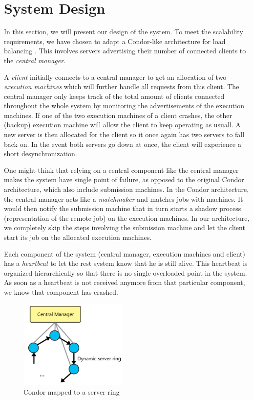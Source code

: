 \documentclass[a4paper,10pt]{article}
\begin{document}
\section{System Design}
\label{sec:design}

In this section, we will present our design of the system.
To meet the scalability requirements, we have chosen to adapt a Condor-like architecture for load balancing \cite{epema1996worldwide}.
This involves servers advertising their number of connected clients to the \emph{central manager}.

A \emph{client} initially connects to a central manager to get an allocation of two \emph{execution machines} which will further handle all requests from this client.
The central manager only keeps track of the total amount of clients connected throughout the whole system by monitoring the advertisements of the execution machines.
If one of the two execution machines of a client crashes, the other (backup) execution machine will allow the client to keep operating as usuall.
A new server is then allocated for the client so it once again has two servers to fall back on.
In the event both servers go down at once, the client will experience a short desynchronization.

One might think that relying on a central component like the central manager makes the system have single point of failure,
as opposed to the original Condor architecture, which also include submission machines.
In the Condor architecture, the central manager acts like a \emph{matchmaker} and matches jobs with machines.
It would then notify the submission machine that in turn starts a shadow process (representation of the remote job) on the execution machines.
In our architecture, we completely skip the steps involving the submission machine and let the client start its job on the allocated execution machines.

Each component of the system (central manager, execution machines and client) has a \emph{heartbeat} to let the rest system know that he is still alive.
This heartbeat is organized hierarchically so that there is no single overloaded point in the system.
As soon as a heartbeat is not received anymore from that particular component, we know that component has crashed.

\begin{figure}
    \begin{center}
        \includegraphics[width=0.48\textwidth]{serverring.png}    
    \end{center}
    \caption{Condor mapped to a server ring}
    \label{fig:serverring}
\end{figure}
\end{document}
